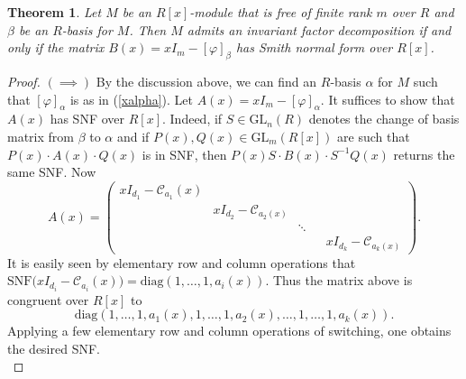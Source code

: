 \documentclass[11pt]{article}
\newtheorem{theorem}[theo]{Theorem}
\theoremstyle{definition}
\numberwithin{equation}{section}
\newcommand{\diag}{\mathrm{diag}}
\newcommand{\GL}{\mathrm{GL}}
\begin{document}
\begin{theorem} \label{RCFEquivSNF} Let $ M $ be an $ R[x] $-module that is free of finite rank $ m $ over $ R$ and  $ \beta $ be an $ R$-basis for $ M $.  Then $M $ admits an invariant factor decomposition if and only if the matrix   $   B(x) =  x I_{m}  -   [    \varphi ] _{     \beta }     $ has Smith normal form over $ R[x] $. 
\end{theorem} 

\begin{proof} $( \! \implies \! ) $ By the discussion above, we can find an $ R$-basis $ \alpha $ for $ M $ such that   $[\varphi]_{\alpha} $ is as in (\ref{xalpha}).  Let $ A(x) = xI_{m} - [\varphi]_{\alpha} $. It suffices to show that $ A(x) $ has SNF over $ R[x] $.  Indeed, if $ S \in \GL_{n}(R)  $ denotes the change of  basis   matrix from $ \beta $ to $ \alpha $  and if $ P(x), Q(x) \in \GL_{m}(R[x]) $ are such  that  $ P(x)   \cdot A(x)  \cdot Q(x) $ is in SNF,  then $ P(x) S  \cdot B(x) \cdot S^{-1} Q(x) $ returns  the same SNF.  Now  
 $$  A(x)  = \begin{pmatrix}   xI_{d_{1}}  -  \mathcal{C}_{a_{1}}(x)  &   &    &    \\[0.2em]
  &   x I_{ d_{2}}  -    \mathcal{C}_{a_{2}(x)} &    &      &       \\[0.2em]
&    &    \ddots    &  &      \\[0.2em]
&                       &                                      &  &       xI_{d_{k}}  -   \mathcal{C}_{a_{k}(x)}      
\end{pmatrix}    . $$   
It is easily seen by elementary row and  column operations that $ \mathrm{SNF}\big (xI_{d_{i}} -  \mathcal{C}_{a_{i}}(x)\big ) = \mathrm{diag} (1,\ldots,1,a_{i}(x)) $. Thus the matrix above is congruent over $ R[x] $ to $$ \diag( 1,  \ldots,   1   ,  a_{1}(x) , 1 , \ldots, 1 ,  a_{2}(x) , \ldots, 1, \ldots,  1 ,   a_ { k }     ( x  )   ) . $$   
Applying a few elementary row and column operations of switching, one obtains the desired SNF. \\         



\end{proof}
\end{document}
